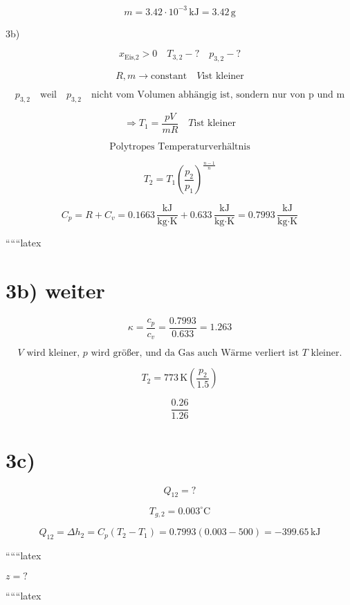 \[
m = 3.42 \cdot 10^{-3} \, \text{kJ} = 3.42 \, \text{g}
\]

3b)

\[
x_{\text{Eis,2}} > 0 \quad T_{3,2} - ? \quad p_{3,2} - ?
\]

\[
R, m \rightarrow \text{constant} \quad V \text{ist kleiner}
\]

\[
p_{3,2} \quad \text{weil} \quad p_{3,2} \quad \text{nicht vom Volumen abhängig ist, sondern nur von p und m}
\]

\[
\Rightarrow T_1 = \frac{pV}{mR} \quad T \text{ist kleiner}
\]

\[
\text{Polytropes Temperaturverhältnis}
\]

\[
T_2 = T_1 \left( \frac{p_2}{p_1} \right)^{\frac{n-1}{n}}
\]

\[
C_p = R + C_v = 0.1663 \, \frac{\text{kJ}}{\text{kg} \cdot \text{K}} + 0.633 \, \frac{\text{kJ}}{\text{kg} \cdot \text{K}} = 0.7993 \, \frac{\text{kJ}}{\text{kg} \cdot \text{K}}
\]

``````latex

\section*{3b) weiter}

\[
\kappa = \frac{c_p}{c_v} = \frac{0.7993}{0.633} = 1.263
\]

\[
V \text{ wird kleiner, } p \text{ wird größer, und da Gas auch Wärme verliert ist } T \text{ kleiner.}
\]

\[
T_2 = 773 \, \text{K} \left( \frac{p_2}{1.5} \right)
\]

\[
\frac{0.26}{1.26}
\]

\section*{3c)}

\[
Q_{12} = ?
\]

\[
T_{g,2} = 0.003^\circ \text{C}
\]

\[
Q_{12} = \Delta h_2 = C_p (T_2 - T_1) = 0.7993 (0.003 - 500) = -399.65 \, \text{kJ}
\]

``````latex


\( z = ? \)

``````latex


